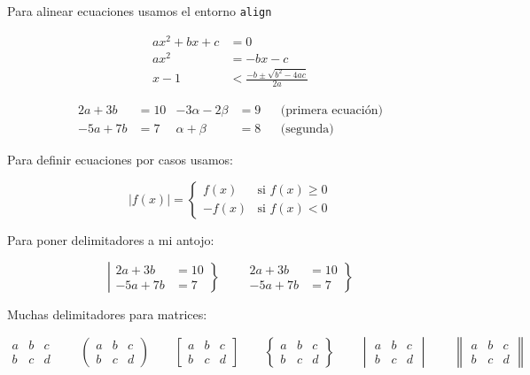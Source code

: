 Para alinear ecuaciones usamos el entorno \texttt{align}

\begin{align}
  ax^2 + bx + c &= 0\\
  ax^2 &= -bx -c\\
  x -1 &< \frac{-b \pm\sqrt{b^2 - 4ac}}{2a}
\end{align}

\begin{align*}
  2a + 3b &= 10 & -3\alpha - 2\beta &= 9 & &\text{(primera ecuación)}\\
  -5a + 7b &= 7 & \alpha + \beta &= 8 & &\text{(segunda)}
\end{align*}

Para definir ecuaciones por casos usamos:

\begin{equation*}
  |f(x)| = \begin{cases}
    f(x) & \text{si $f(x) \geq 0$}\\
    -f(x) & \text{si $f(x) < 0$}
  \end{cases}
\end{equation*}

Para poner delimitadores a mi antojo:

\begin{equation*}
  \left|\begin{aligned}
    2a+3b &= 10\\
    -5a+7b &= 7
  \end{aligned}\right\} \qquad
  \left.\begin{aligned}
    2a+3b &= 10\\
    -5a+7b &= 7
  \end{aligned}\right\}
\end{equation*}

Muchas delimitadores para matrices:

\begin{equation*}
  \begin{matrix}
    a & b & c \\
    b & c & d
  \end{matrix}\qquad
  \begin{pmatrix}
    a & b & c \\
    b & c & d
  \end{pmatrix}\qquad
  \begin{bmatrix}
    a & b & c \\
    b & c & d
  \end{bmatrix}\qquad 
  \begin{Bmatrix}
    a & b & c \\
    b & c & d
  \end{Bmatrix}\qquad
  \begin{vmatrix}
    a & b & c \\
    b & c & d
  \end{vmatrix}\qquad  
  \begin{Vmatrix}
    a & b & c \\
    b & c & d
  \end{Vmatrix}\qquad
\end{equation*}


